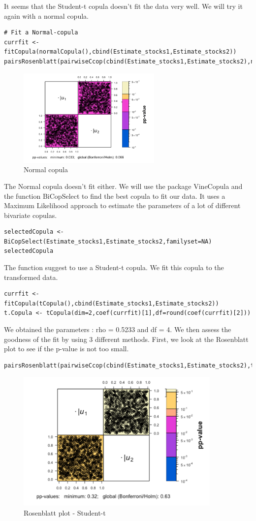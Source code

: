\documentclass[11pt]{article}
\begin{document}
It seems that the Student-t copula doesn't fit the data very well.
We will try it again with a normal copula.
\begin{lstlisting}
# Fit a Normal-copula
currfit <- fitCopula(normalCopula(),cbind(Estimate_stocks1,Estimate_stocks2))
pairsRosenblatt(pairwiseCcop(cbind(Estimate_stocks1,Estimate_stocks2),normalCopula(0.53)))
\end{lstlisting}
\begin{figure}[!ht]
 \center
  \includegraphics[width=70mm]{Normal}
  \caption{Normal copula}
  \label{fig:plot data}
\end{figure}
\pagebreak
The Normal copula doesn't fit either.
We will use the package VineCopula and the function BiCopSelect to find the best copula to fit our data. It uses a Maximum Likelihood approach to estimate the parameters of a lot of different bivariate copulas.
\begin{lstlisting}
selectedCopula <- BiCopSelect(Estimate_stocks1,Estimate_stocks2,familyset=NA)
selectedCopula
\end{lstlisting}
The function suggest to use a Student-t copula.
We fit this copula to the transformed data.
\begin{lstlisting}
currfit <- fitCopula(tCopula(),cbind(Estimate_stocks1,Estimate_stocks2))
t.Copula <- tCopula(dim=2,coef(currfit)[1],df=round(coef(currfit)[2]))
\end{lstlisting}
We obtained the parameters : rho = 0.5233 and df = 4.
We then assess the goodness of the fit by using 3 different methods.
First, we look at the Rosenblatt plot to see if the p-value is not too small.
\begin{lstlisting}
pairsRosenblatt(pairwiseCcop(cbind(Estimate_stocks1,Estimate_stocks2),t.Copula))
\end{lstlisting}
\begin{figure}[!ht]
 \center
  \includegraphics[width=100mm]{Rosenblatt}
  \caption{Rosenblatt plot - Student-t}
  \label{fig:plot data}
\end{figure}
\end{document}
